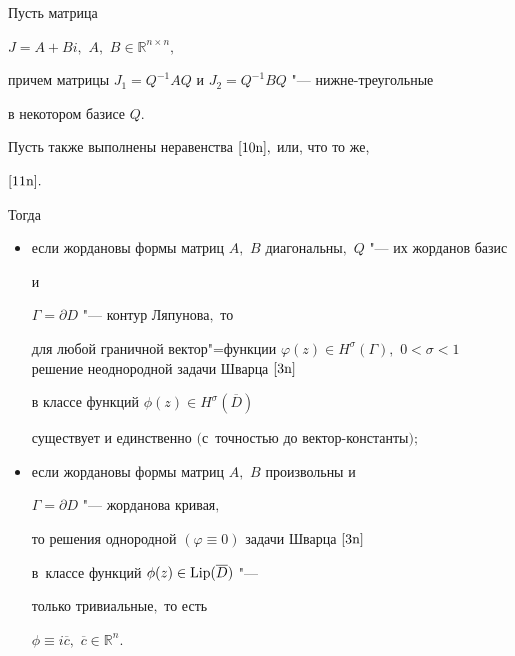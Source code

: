 \begin{theorem}[4]Пусть матрица

$J=A+Bi,$ $A,$ $B\in\mathbb{R}^{n\times n},$

причем матрицы   $J_1=Q^{-1}AQ$ и $J_2=Q^{-1}BQ$ "---  нижне-треугольные

в некотором базисе $Q.$ 

Пусть также  выполнены неравенства  $\eqref{10n},$ или, что то же,

  $\eqref{11n}.$  

  Тогда

\begin{itemize}



\hypertarget{nik:th4-1}{}

\item[$1)$] если  жордановы  формы матриц $A,$ $B$ диагональны$,$ $Q$ "--- их жорданов базис

   и

 $\Gamma=\partial D$ "--- контур Ляпунова$,$ то

 для любой граничной вектор"=функции $\varphi(z)\in

 H^\sigma(\Gamma),$ $0<\sigma<1$  решение неоднородной задачи Шварца $\eqref{3n}$

 в классе  функций $\phi(z) \in H^\sigma(\overline{D})$

существует и  единственно $($с~точностью до вектор-константы$);$



\hypertarget{nik:th4-2}{}



\item[$2)$]  если  жордановы формы  матриц $A,$ $B$ произвольны  и

   $\Gamma=\partial D$ "--- жорданова кривая$,$

то решения однородной $(\varphi\equiv 0)$ задачи  Шварца $\eqref{3n}$

 в~классе  функций $\phi(z) \in {\rm Lip} (\overline{D})$ "---

только тривиальные$,$ то есть

$\phi\equiv i\overline{c},$ $\overline{c}\in \mathbb{R}^{n}.$



\end{itemize}

\end{theorem}



\smallskip



